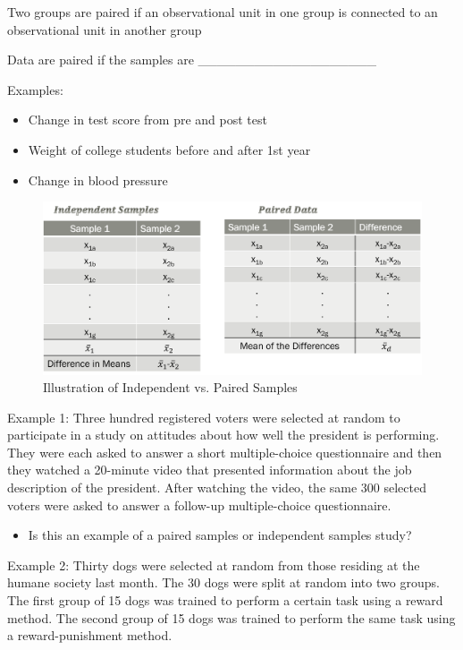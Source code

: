 \documentclass[
]{report}
\providecommand{\tightlist}{%
  \setlength{\itemsep}{0pt}\setlength{\parskip}{0pt}}
\newcommand{\rgi}{\hspace{24pt}}  %
\begin{document}
Two groups are paired if an observational unit in one group is connected to an observational unit in another group

\rgi Data are paired if the samples are \_\_\_\_\_\_\_\_\_\_\_\_\_\_\_\_\_\_\_

Examples:

\begin{itemize}
\item
  Change in test score from pre and post test
\item
  Weight of college students before and after 1st year
\item
  Change in blood pressure
\end{itemize}

\begin{figure}

{\centering \includegraphics[width=0.6\linewidth]{images/paired_independent} 

}

\caption{Illustration of Independent vs. Paired Samples}\label{fig:pairedindependent}
\end{figure}

Example 1: Three hundred registered voters were selected at random to participate in a study on attitudes about how well the president is performing. They were each asked to answer a short multiple-choice questionnaire and then they watched a 20-minute video that presented information about the job description of the president. After watching the video, the same 300 selected voters were asked to answer a follow-up multiple-choice questionnaire.

\begin{itemize}
\tightlist
\item
  Is this an example of a paired samples or independent samples study?
\end{itemize}

\vspace{0.3in}

\newpage

Example 2: Thirty dogs were selected at random from those residing at the humane society last month. The 30 dogs were split at random into two groups. The first group of 15 dogs was trained to perform a certain task using a reward method. The second group of 15 dogs was trained to perform the same task using a reward-punishment method.
\end{document}

